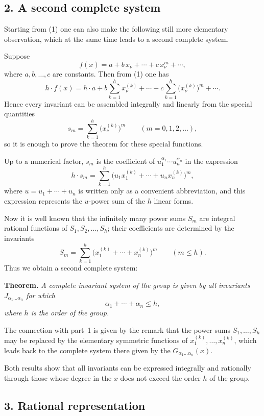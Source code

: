 \documentclass[11pt]{article}
\begin{document}
\subsection*{2. A second complete system}

Starting from \textup{(1)} one can also make the following still more elementary observation, which at the same time leads to a second complete system.

Suppose
\[
f(x)=a+b\,x_\nu+\cdots+c\,x_\nu^m+\cdots,
\]
where $a,b,\dots,c$ are constants. Then from \textup{(1)} one has
\[
h\cdot f(x)
 = h\cdot a
   + b\sum_{k=1}^h x^{(k)}_\nu
   + \cdots
   + c\sum_{k=1}^h \bigl(x^{(k)}_\nu\bigr)^m
   + \cdots.
\]
Hence every invariant can be assembled integrally and linearly from the special quantities
\[
s_m=\sum_{k=1}^h \bigl(x^{(k)}_\nu\bigr)^m
\qquad (m=0,1,2,\dots),
\]
so it is enough to prove the theorem for these special functions.

Up to a numerical factor, $s_m$ is the coefficient of $u_1^{\alpha_1}\cdots u_n^{\alpha_n}$ in the expression
\[
h\cdot s_m=\sum_{k=1}^h\bigl(u_1x^{(k)}_1+\cdots+u_nx^{(k)}_n\bigr)^m,
\]
where $u=u_1+\cdots+u_n$ is written only as a convenient abbreviation, and this expression represents the $u$-power sum of the $h$ linear forms.

Now it is well known that the infinitely many power sums $S_m$ are integral rational functions of $S_1,S_2,\dots,S_h$; their coefficients are determined by the invariants
\[
S_m=\sum_{k=1}^h\bigl(x^{(k)}_1+\cdots+x^{(k)}_n\bigr)^m
\qquad (m\le h).
\]
Thus we obtain a second complete system:

\medskip
\noindent
\textbf{Theorem.}
\emph{A complete invariant system of the group is given by all invariants $J_{\alpha_1\dots\alpha_n}$ for which}
\[
\alpha_1+\cdots+\alpha_n\le h,
\]
\emph{where $h$ is the order of the group.}

The connection with part~1 is given by the remark that the power sums $S_1,\dots,S_h$ may be replaced by the elementary symmetric functions of $x^{(k)}_1,\dots,x^{(k)}_n$, which leads back to the complete system there given by the $G_{\alpha_1\dots\alpha_n}(x)$.

Both results show that all invariants can be expressed integrally and rationally through those whose degree in the $x$ does not exceed the order $h$ of the group.

\subsection*{3. Rational representation}
\end{document}
